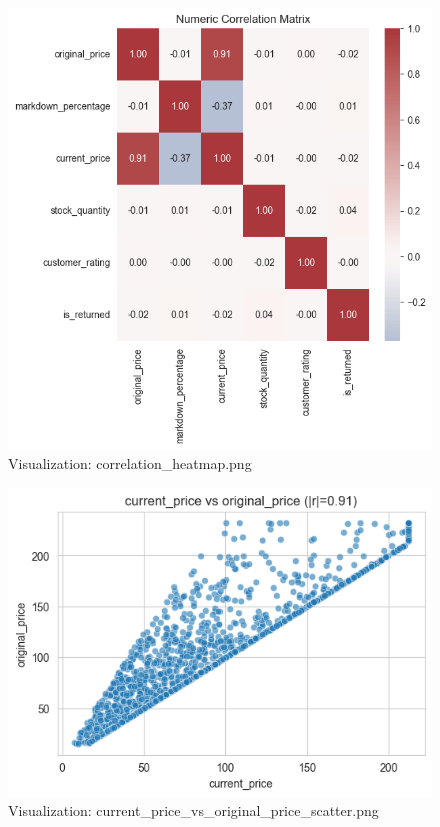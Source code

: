 \documentclass{article}%
\begin{document}
\vspace{10pt}%
\\%
\begin{minipage}[c]{0.48\textwidth}%


\begin{figure}[H]%
\centering%
\includegraphics[width=\linewidth]{output/plots/correlation_heatmap.png}%
\caption{Visualization: correlation\_heatmap.png}%
\end{figure}

%
\end{minipage}%
\begin{minipage}[c]{0.48\textwidth}%


\begin{figure}[H]%
\centering%
\includegraphics[width=\linewidth]{output/plots/current_price_vs_original_price_scatter.png}%
\caption{Visualization: current\_price\_vs\_original\_price\_scatter.png}%
\end{figure}

%
\end{minipage}%
\end{document}
